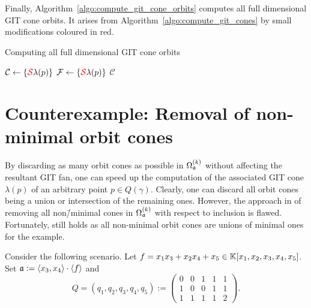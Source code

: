 Finally, Algorithm~\ref{algo:compute_git_cone_orbits} computes all full dimensional GIT cone orbits. It arises from Algorithm~\ref{algo:compute_git_cones} by small modifications coloured in red.

\begin{algorithm}
	\caption{Computing all full dimensional GIT cone orbits}
	\label{algo:compute_git_cone_orbits}
	
	\BlankLine
	$\mathcal{C} \leftarrow \{\textcolor{red}{\mathcal{S}}\lambda(p)\}$\;
	$\mathcal{F} \leftarrow \{\textcolor{red}{\mathcal{S}}\lambda(p)\}$\;
	\Return $\mathcal{C}$\;
\end{algorithm}


\section{Counterexample: Removal of non-minimal orbit cones}

By discarding as many orbit cones as possible in $\Omega_{\mathfrak{a}}^{(k)}$ without affecting the resultant GIT fan, one can speed up the computation of the associated GIT cone $\lambda(p)$ of an arbitrary point $p\in Q(\gamma)$. Clearly, one can discard all orbit cones being a union or intersection of the remaining ones. However, the approach in \cite{gitfan_symmetry} of removing all non\=/minimal cones in $\Omega_{\mathfrak{a}}^{(k)}$ with respect to inclusion is flawed. Fortunately, \cite[Theorem 1.1]{gitfan_symmetry} still holds as all non-minimal orbit cones are unions of minimal ones for the \msix{} example.

Consider the following scenario. Let $f = x_1x_3+x_2x_4+x_5\in \mathbb{K}[x_1,x_2,x_3,x_4,x_5]$. Set  $\mathfrak{a} := \langle x_3, x_4\rangle \cdot \langle f\rangle$ and
$$Q = (q_1, q_2, q_3, q_4, q_5) := \begin{pmatrix}
0 & 0 & 1 & 1 & 1 \\
1 & 0 & 0 & 1 & 1 \\
1 & 1 & 1 & 1 & 2 
\end{pmatrix}.$$

